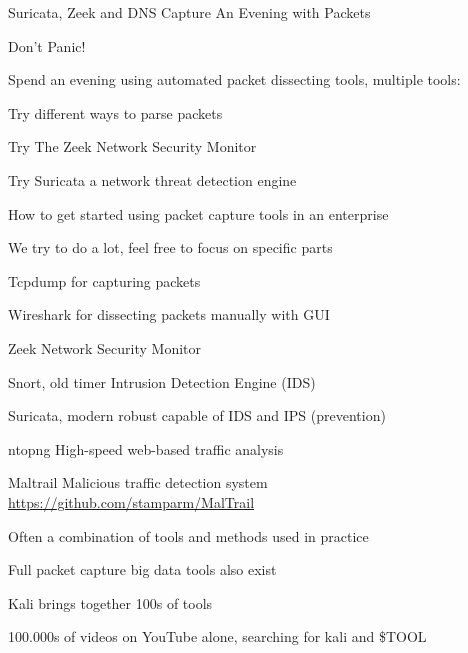 \documentclass[Screen16to9,17pt]{foils}
\begin{document}
\rm
{}
\mytitlepage
{Suricata, Zeek and DNS Capture}
{An Evening with Packets}

\LogoOn




\centerline{\color{titlecolor}\LARGE Don't Panic!}

Spend an evening using automated packet dissecting tools, multiple tools:
\begin{list1}
\item Try different ways to parse packets
\item Try The Zeek Network Security Monitor
\item Try Suricata a network threat detection engine
\item How to get started using packet capture tools in an enterprise
\end{list1}

\centerline{We try to do a lot, feel free to focus on specific parts}


\begin{list1}
\item Tcpdump for capturing packets
\item Wireshark for dissecting packets manually with GUI
\item Zeek Network Security Monitor
\item Snort, old timer Intrusion Detection Engine (IDS)
\item Suricata, modern robust capable of IDS and IPS (prevention)
\item ntopng High-speed web-based traffic analysis
\item Maltrail Malicious traffic detection system \url{https://github.com/stamparm/MalTrail}
\end{list1}

\vskip 5mm
\centerline{Often a combination of tools and methods used in practice}

Full packet capture big data tools also exist



\begin{list1}
\item Kali  brings together 100s of tools
\item 100.000s of videos on YouTube alone, searching for kali and \$TOOL
\end{list1}
\end{document}

